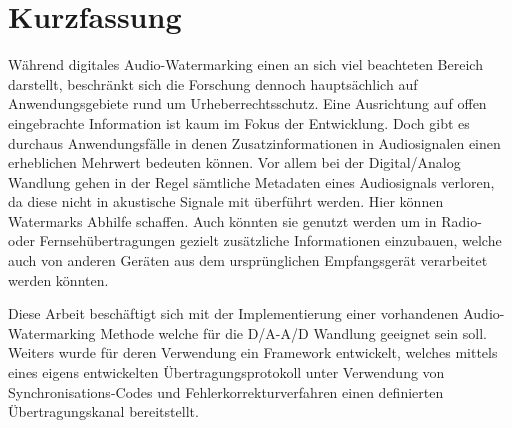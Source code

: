 \chapter*{Kurzfassung}

Während digitales Audio-Watermarking einen an sich viel beachteten Bereich darstellt, beschränkt sich die Forschung dennoch hauptsächlich auf Anwendungsgebiete rund um Urheberrechtsschutz. Eine Ausrichtung auf offen eingebrachte Information ist kaum im Fokus der Entwicklung. Doch gibt es durchaus Anwendungsfälle in denen Zusatzinformationen in Audiosignalen einen erheblichen Mehrwert bedeuten können. Vor allem bei der Digital/Analog Wandlung gehen in der Regel sämtliche Metadaten eines Audiosignals verloren, da diese nicht in akustische Signale mit überführt werden.
Hier können Watermarks Abhilfe schaffen. Auch könnten sie genutzt werden um in Radio- oder Fernsehübertragungen gezielt zusätzliche Informationen einzubauen, welche auch von anderen Geräten aus dem ursprünglichen Empfangsgerät verarbeitet werden könnten.

Diese Arbeit beschäftigt sich mit der Implementierung einer vorhandenen Audio-Water\-marking Methode welche für die D/A-A/D Wandlung geeignet sein soll. Weiters wurde für deren Verwendung ein Framework entwickelt, welches mittels eines eigens entwickelten Übertragungsprotokoll unter Verwendung von Synchronisations-Codes und Fehlerkorrekturverfahren einen definierten Übertragungskanal bereitstellt. 